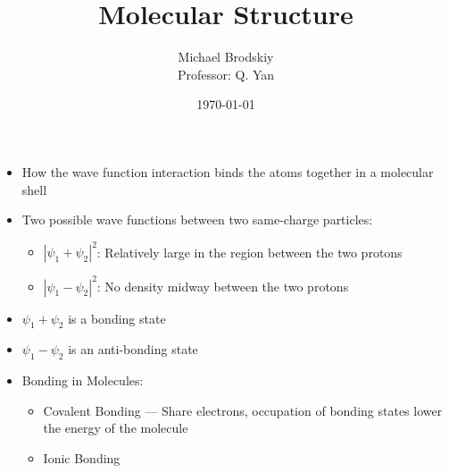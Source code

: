 


\title{Molecular Structure}
\date{\today}
\author{Michael Brodskiy\\ \small Professor: Q. Yan}



\maketitle

\newpage

\tableofcontents

\newpage

\begin{itemize}

    \section{The Hydrogen Molecule}

  \item How the wave function interaction binds the atoms together in a molecular shell

  \item Two possible wave functions between two same-charge particles:

    \begin{itemize}

      \item $|\psi_1+\psi_2|^2$: Relatively large in the region between the two protons

      \item $|\psi_1-\psi_2|^2$: No density midway between the two protons

    \end{itemize}

  \item $\psi_1+\psi_2$ is a bonding state

  \item $\psi_1-\psi_2$ is an anti-bonding state

  \item Bonding in Molecules:

    \begin{itemize}

      \item Covalent Bonding — Share electrons, occupation of bonding states lower the energy of the molecule

      \item Ionic Bonding

    \end{itemize}

\end{itemize}



